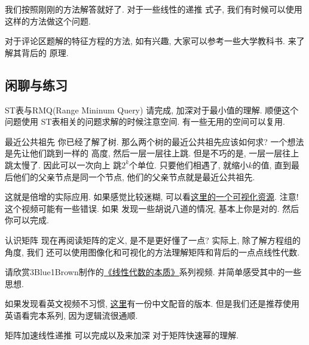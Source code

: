 我们按照刚刚的方法解答就好了. 对于一些线性的递推
式子, 我们有时候可以使用这样的方法做这个问题. 

对于评论区题解的特征方程的方法, 如有兴趣, 大家可以参考一些大学教科书. 来了解其背后的
原理. 

\subsection*{闲聊与练习}

\begin{exercise}{ST表与RMQ(Range Mininum Query)}
    请完成, 加深对于最小值的理解. 顺便这个问题使用
    ST表相关的问题求解的时候注意空间. 有一些无用的空间可以复用. 
\end{exercise}

\begin{exercise}{最近公共祖先}
    你已经了解了树. 那么两个树的最近公共祖先应该如何求? 一个想法是先让他们跳到一样的
    高度, 然后一层一层往上跳. 但是不巧的是, 一层一层往上跳太慢了. 因此可以一次向上
    跳$2^k$个单位. 只要他们相遇了, 就缩小$k$的值, 直到最后他们的父亲节点是同一个节点,
    他们的父亲节点就是最近公共祖先. 

    这就是倍增的实际应用. 如果感觉比较迷糊, 可以看\href{https://www.bilibili.com/video/BV1N7411G7JD}{这里的一个可视化资源}. 注意! 这个视频可能有一些错误. 如果
    发现一些胡说八道的情况, 基本上你是对的. 然后你可以完成. 
\end{exercise}

\begin{exercise}{认识矩阵}
    现在再阅读矩阵的定义, 是不是更好懂了一点? 实际上, 除了解方程组的角度, 我们
    还可以使用图像化和可视化的方法理解矩阵和背后的一点点线性代数. 

    请欣赏3Blue1Brown制作的\href{https://www.bilibili.com/video/BV1ys411472E}{《线性代数的本质》}系列视频. 并简单感受其中的一些思想. 

    如果发现看英文视频不习惯, \href{https://www.bilibili.com/video/BV1ib411t7YR}{这里}有一份中文配音的版本. 但是我们还是推荐使用英语看完本系列, 因为逻辑流很通顺.
    
\end{exercise}

\begin{exercise}{矩阵加速线性递推}
    可以完成以及来加深
    对于矩阵快速幂的理解. 
    
\end{exercise}

